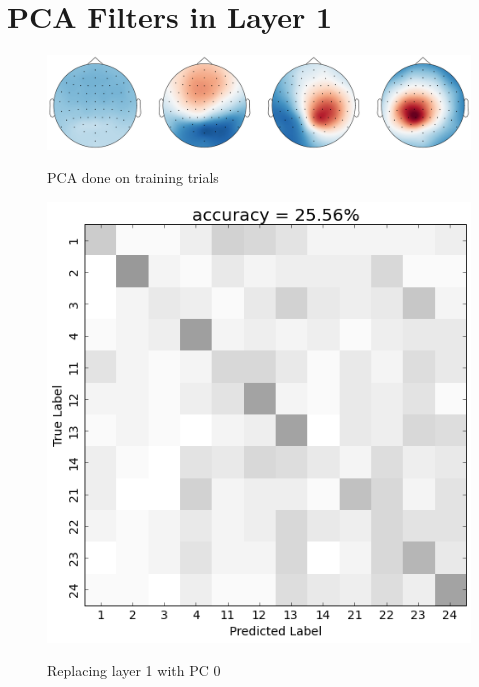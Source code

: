 \chapter{PCA Filters in Layer 1}
\begin{figure}[h] 
  \begin{center}
   \includegraphics[width=.5\textwidth,keepaspectratio=true]{Figures/PCA_SVM}
   \\\vspace{-0.8em}
    \caption{PCA done on training trials}
    \label{fig:PCA_SVM}
  \end{center}
  \vspace{-1em}
\end{figure}

\begin{figure}[h] 
  \begin{center}
    \includegraphics[scale=0.5]{Figures/PC0_confusion}
   \\\vspace{-0.8em}
    \caption{Replacing layer 1 with PC 0}
    \label{fig:PC0_confusion}
  \end{center}
  \vspace{-1em}
\end{figure}


